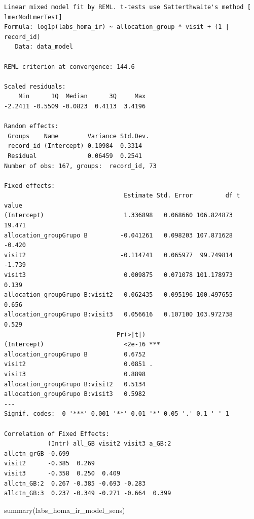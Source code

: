 \documentclass[
  letterpaper,
  DIV=11,
  numbers=noendperiod]{scrartcl}
\newenvironment{Shaded}{\begin{snugshade}}{\end{snugshade}}
\newcommand{\FunctionTok}[1]{\textcolor[rgb]{0.28,0.35,0.67}{#1}}
\newcommand{\NormalTok}[1]{\textcolor[rgb]{0.00,0.23,0.31}{#1}}
\begin{document}
\begin{verbatim}
Linear mixed model fit by REML. t-tests use Satterthwaite's method [
lmerModLmerTest]
Formula: log1p(labs_homa_ir) ~ allocation_group * visit + (1 | record_id)
   Data: data_model

REML criterion at convergence: 144.6

Scaled residuals: 
    Min      1Q  Median      3Q     Max 
-2.2411 -0.5509 -0.0823  0.4113  3.4196 

Random effects:
 Groups    Name        Variance Std.Dev.
 record_id (Intercept) 0.10984  0.3314  
 Residual              0.06459  0.2541  
Number of obs: 167, groups:  record_id, 73

Fixed effects:
                                 Estimate Std. Error         df t value
(Intercept)                      1.336898   0.068660 106.824873  19.471
allocation_groupGrupo B         -0.041261   0.098203 107.871628  -0.420
visit2                          -0.114741   0.065977  99.749814  -1.739
visit3                           0.009875   0.071078 101.178973   0.139
allocation_groupGrupo B:visit2   0.062435   0.095196 100.497655   0.656
allocation_groupGrupo B:visit3   0.056616   0.107100 103.972738   0.529
                               Pr(>|t|)    
(Intercept)                      <2e-16 ***
allocation_groupGrupo B          0.6752    
visit2                           0.0851 .  
visit3                           0.8898    
allocation_groupGrupo B:visit2   0.5134    
allocation_groupGrupo B:visit3   0.5982    
---
Signif. codes:  0 '***' 0.001 '**' 0.01 '*' 0.05 '.' 0.1 ' ' 1

Correlation of Fixed Effects:
            (Intr) all_GB visit2 visit3 a_GB:2
allctn_grGB -0.699                            
visit2      -0.385  0.269                     
visit3      -0.358  0.250  0.409              
allctn_GB:2  0.267 -0.385 -0.693 -0.283       
allctn_GB:3  0.237 -0.349 -0.271 -0.664  0.399
\end{verbatim}

\begin{Shaded}
\begin{Highlighting}[]
\FunctionTok{summary}\NormalTok{(labs\_homa\_ir\_model\_sens)}
\end{Highlighting}
\end{Shaded}
\end{document}
